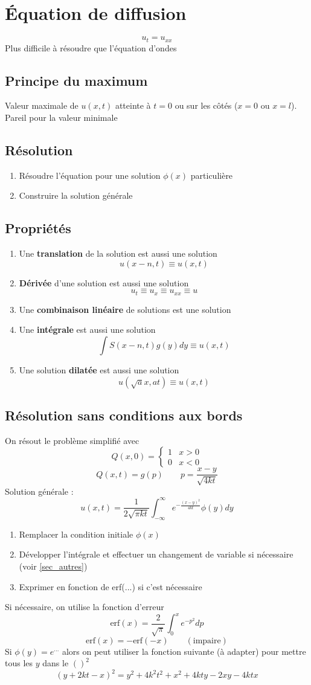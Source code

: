 \documentclass[resume]{subfiles}
\begin{document}
\section{Équation de diffusion}
$$\boxed{u_{t}=u_{xx}}$$
Plus difficile à résoudre que l'équation d'ondes
\subsection{Principe du maximum}
Valeur maximale de $u(x,t)$ atteinte à $t=0$ ou sur les côtés ($x=0$ ou $x=l$). Pareil pour la valeur minimale
\subsection{Résolution}
\begin{enumerate}
\item Résoudre l'équation pour une solution $\phi(x)$ particulière
\item Construire la solution générale
\end{enumerate}
\subsection{Propriétés}
\begin{enumerate}
\item Une \textbf{translation} de la solution est aussi une solution
$$u(x-n,t)\equiv u(x,t)$$
\item \textbf{Dérivée} d'une solution est aussi une solution
$$u_t\equiv u_x\equiv u_{xx}\equiv u$$
\item Une \textbf{combinaison linéaire} de solutions est une solution
\item Une \textbf{intégrale} est aussi une solution
$$\int S(x-n,t)g(y)dy\equiv u(x,t)$$
\item Une solution \textbf{dilatée} est aussi une solution
$$u(\sqrt{a}x,at)\equiv u(x,t)$$
\end{enumerate}
\subsection{Résolution sans conditions aux bords}
On résout le problème simplifié avec
$$Q(x,0)=\begin{cases}1 & x>0\\0 & x<0\end{cases}$$
$$Q(x,t)=g(p)\qquad p=\frac{x-y}{\sqrt{4kt}}$$
Solution générale :
$$u(x,t)=\frac{1}{2\sqrt{\pi kt}}\int_{-\infty}^{\infty}e^{-\frac{(x-y)^2}{4kt}}\phi(y)dy$$
\begin{enumerate}
\item Remplacer la condition initiale $\phi(x)$
\item Développer l'intégrale et effectuer un changement de variable si nécessaire (voir \ref{sec_autres})
\item Exprimer en fonction de erf(...) si c'est nécessaire
\end{enumerate}
Si nécessaire, on utilise la fonction d'erreur
$$\text{erf}(x)=\frac{2}{\sqrt{\pi}}\int_{0}^{x}e^{-p^2}dp$$
$$\text{erf}(x)=-\text{erf}(-x)\qquad (\text{impaire})$$
Si $\phi(y)=e^{...}$ alors on peut utiliser la fonction suivante (à adapter) pour mettre tous les $y$ dans le $()^2$
$$(y+2kt-x)^2=y^2+4k^2t^2+x^2+4kty-2xy-4ktx$$
\end{document}
